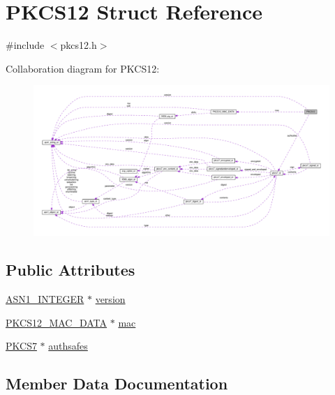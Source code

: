 \hypertarget{struct_p_k_c_s12}{}\section{P\+K\+C\+S12 Struct Reference}
\label{struct_p_k_c_s12}


{\ttfamily \#include $<$pkcs12.\+h$>$}



Collaboration diagram for P\+K\+C\+S12\+:
\nopagebreak
\begin{figure}[H]
\begin{center}
\leavevmode
\includegraphics[width=350pt]{struct_p_k_c_s12__coll__graph}
\end{center}
\end{figure}
\subsection*{Public Attributes}
\begin{DoxyCompactItemize}
\item 
\hyperlink{ossl__typ_8h_af4335399bf9774cb410a5e93de65998b}{A\+S\+N1\+\_\+\+I\+N\+T\+E\+G\+ER} $\ast$ \hyperlink{struct_p_k_c_s12_a36ed18715f06725345e12b6f9904e908}{version}
\item 
\hyperlink{struct_p_k_c_s12___m_a_c___d_a_t_a}{P\+K\+C\+S12\+\_\+\+M\+A\+C\+\_\+\+D\+A\+TA} $\ast$ \hyperlink{struct_p_k_c_s12_a5184aa35cbf7f56ab133402077c9ea8e}{mac}
\item 
\hyperlink{pkcs7_8h_af773f722a43f0fee6be7bfc1721c5290}{P\+K\+C\+S7} $\ast$ \hyperlink{struct_p_k_c_s12_ab861e41463d92627b4ff4a42ca1d2cee}{authsafes}
\end{DoxyCompactItemize}


\subsection{Member Data Documentation}
